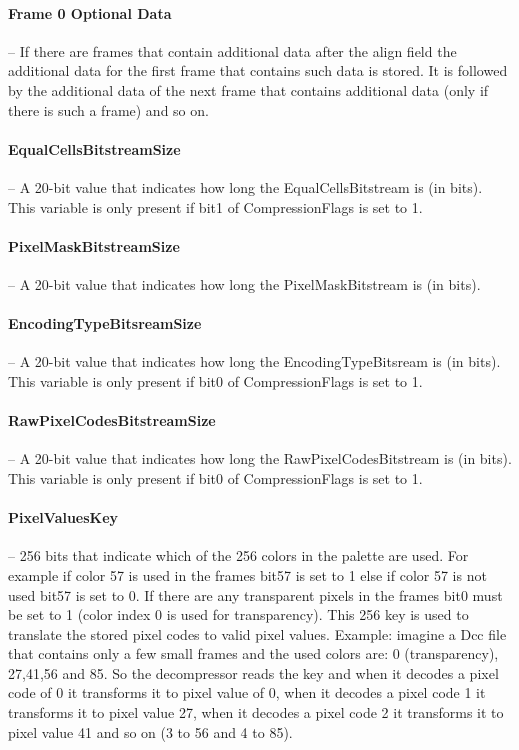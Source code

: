 \paragraph{Frame 0 Optional Data} -- If there are frames that contain additional 
data after the align field the additional data for the first frame that contains 
such data is stored. It is followed by the additional data of the next frame 
that contains additional data (only if there is such a frame) and so on.	

\paragraph{EqualCellsBitstreamSize} -- A 20-bit value that indicates how long 
the EqualCellsBitstream is (in bits). This variable is only present if bit1 of 
CompressionFlags is set to 1.	

\paragraph{PixelMaskBitstreamSize} -- A 20-bit value that indicates how long the 
PixelMaskBitstream is (in bits).	

\paragraph{EncodingTypeBitsreamSize} -- A 20-bit value that indicates how long 
the EncodingTypeBitsream is (in bits). This variable is only present if bit0 of 
CompressionFlags is set to 1.	

\paragraph{RawPixelCodesBitstreamSize} -- A 20-bit value that indicates how long 
the RawPixelCodesBitstream is (in bits). This variable is only present if bit0 
of CompressionFlags is set to 1.	

\paragraph{PixelValuesKey} -- 256 bits that indicate which of the 256 colors in 
the palette are used. For example if color 57 is used in the frames bit57 is set 
to 1 else if color 57 is not used bit57 is set to 0. If there are any 
transparent pixels in the frames bit0 must be set to 1 (color index 0 is used 
for transparency). This 256 key is used to translate the stored pixel codes to 
valid pixel values. Example: imagine a Dcc file that contains only a few small 
frames and the used colors are: 0 (transparency), 27,41,56 and 85. So the 
decompressor reads the key and when it decodes a pixel code of 0 it transforms 
it to pixel value of 0, when it decodes a pixel code 1 it transforms it to pixel 
value 27, when it decodes a pixel code 2 it transforms it to pixel value 41 and 
so on (3 to 56 and 4 to 85).	

